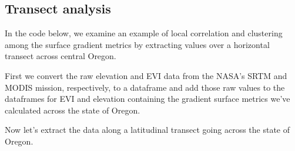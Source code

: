 \documentclass[
]{article}
\newenvironment{Shaded}{\begin{snugshade}}{\end{snugshade}}
\newcommand{\CommentTok}[1]{\textcolor[rgb]{0.56,0.35,0.01}{\textit{#1}}}
\newcommand{\ControlFlowTok}[1]{\textcolor[rgb]{0.13,0.29,0.53}{\textbf{#1}}}
\newcommand{\DecValTok}[1]{\textcolor[rgb]{0.00,0.00,0.81}{#1}}
\newcommand{\FunctionTok}[1]{\textcolor[rgb]{0.00,0.00,0.00}{#1}}
\newcommand{\NormalTok}[1]{#1}
\newcommand{\OtherTok}[1]{\textcolor[rgb]{0.56,0.35,0.01}{#1}}
\newcommand{\SpecialCharTok}[1]{\textcolor[rgb]{0.00,0.00,0.00}{#1}}
\newcommand{\StringTok}[1]{\textcolor[rgb]{0.31,0.60,0.02}{#1}}
\begin{document}
\hypertarget{transect-analysis}{%
\subsection{Transect analysis}\label{transect-analysis}}

In the code below, we examine an example of local correlation and
clustering among the surface gradient metrics by extracting values over
a horizontal transect across central Oregon.

First we convert the raw elevation and EVI data from the NASA's SRTM and
MODIS mission, respectively, to a dataframe and add those raw values to
the dataframes for EVI and elevation containing the gradient surface
metrics we've calculated across the state of Oregon.

\begin{Shaded}
\end{Shaded}

Now let's extract the data along a latitudinal transect going across the
state of Oregon.
\end{document}
